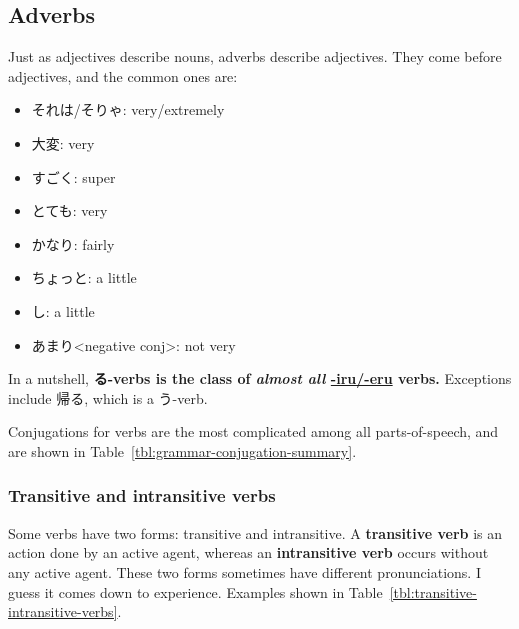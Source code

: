 \documentclass[../nihongo-gakushuu-kyouzai.tex]{subfiles}
\begin{document}
\begin{table}[h]
\centering
\subsection{Adverbs} \label{sec:adverb}
Just as adjectives describe nouns, adverbs describe adjectives. They come before adjectives, and the common ones are:
\begin{itemize}
    \item それは/そりゃ: very/extremely
    \item 大変: very
    \item すごく: super
    \item とても: very
    \item かなり: fairly
    \item ちょっと: a little
    \item {}し: a little
    \item あまり<negative conj>: not very
\end{itemize}
\label{tbl:verb-classification}
\end{table}

In a nutshell, \textbf{る-verbs is the class of \emph{almost all} \ul{-iru/-eru} verbs.} Exceptions include 帰る, which is a う-verb.

Conjugations for verbs are the most complicated among all parts-of-speech, and are shown in Table~\ref{tbl:grammar-conjugation-summary}.

\subsubsection{Transitive and intransitive verbs} \label{sec:transitive-intransitive-verbs}

Some verbs have two forms: transitive and intransitive. A \textbf{transitive verb} is an action done by an active agent, whereas an \textbf{intransitive verb} occurs without any active agent. These two forms sometimes have different pronunciations. I guess it comes down to experience. Examples shown in Table~\ref{tbl:transitive-intransitive-verbs}.
\end{document}
